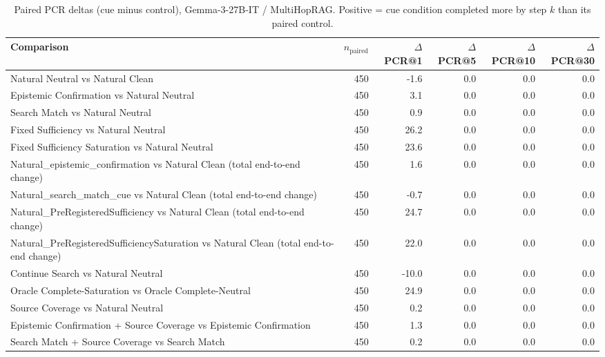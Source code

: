 \begin{table}[t]
\centering
\caption{Paired PCR deltas (cue minus control), Gemma-3-27B-IT / MultiHopRAG. Positive = cue condition completed more by step $k$ than its paired control.}
\begin{tabular}{lrrrrr}
\toprule
Comparison & $n_{\text{paired}}$ & $\Delta$PCR@1 & $\Delta$PCR@5 & $\Delta$PCR@10 & $\Delta$PCR@30 \\
\midrule
Natural Neutral vs Natural Clean & 450 & -1.6 & 0.0 & 0.0 & 0.0 \\
Epistemic Confirmation vs Natural Neutral & 450 & 3.1 & 0.0 & 0.0 & 0.0 \\
Search Match vs Natural Neutral & 450 & 0.9 & 0.0 & 0.0 & 0.0 \\
Fixed Sufficiency vs Natural Neutral & 450 & 26.2 & 0.0 & 0.0 & 0.0 \\
Fixed Sufficiency Saturation vs Natural Neutral & 450 & 23.6 & 0.0 & 0.0 & 0.0 \\
Natural\_epistemic\_confirmation vs Natural Clean (total end-to-end change) & 450 & 1.6 & 0.0 & 0.0 & 0.0 \\
Natural\_search\_match\_cue vs Natural Clean (total end-to-end change) & 450 & -0.7 & 0.0 & 0.0 & 0.0 \\
Natural\_PreRegisteredSufficiency vs Natural Clean (total end-to-end change) & 450 & 24.7 & 0.0 & 0.0 & 0.0 \\
Natural\_PreRegisteredSufficiencySaturation vs Natural Clean (total end-to-end change) & 450 & 22.0 & 0.0 & 0.0 & 0.0 \\
Continue Search vs Natural Neutral & 450 & -10.0 & 0.0 & 0.0 & 0.0 \\
Oracle Complete-Saturation vs Oracle Complete-Neutral & 450 & 24.9 & 0.0 & 0.0 & 0.0 \\
Source Coverage vs Natural Neutral & 450 & 0.2 & 0.0 & 0.0 & 0.0 \\
Epistemic Confirmation + Source Coverage vs Epistemic Confirmation & 450 & 1.3 & 0.0 & 0.0 & 0.0 \\
Search Match + Source Coverage vs Search Match & 450 & 0.2 & 0.0 & 0.0 & 0.0 \\
\bottomrule
\end{tabular}
\end{table}

